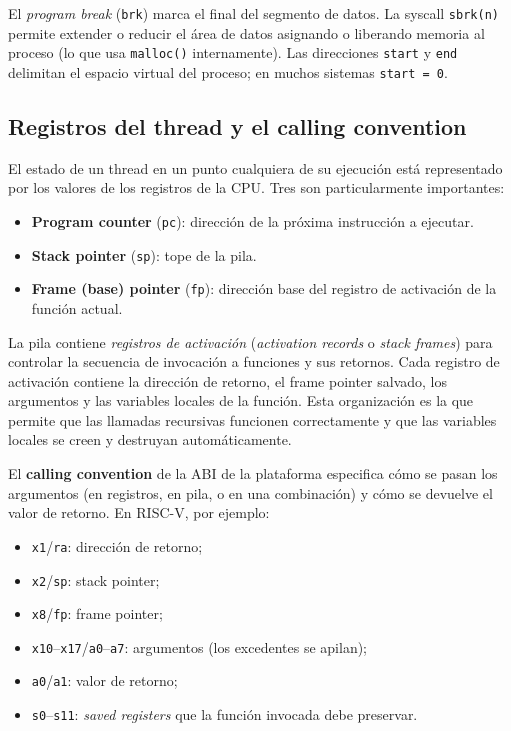 \documentclass[11pt,a4paper]{article}
\begin{document}
El \emph{program break} (\texttt{brk}) marca el final del segmento de
datos. La syscall \texttt{sbrk(n)} permite extender o reducir el área
de datos asignando o liberando memoria al proceso (lo que usa
\texttt{malloc()} internamente). Las direcciones \texttt{start} y
\texttt{end} delimitan el espacio virtual del proceso; en muchos
sistemas \texttt{start = 0}.

\subsection{Registros del thread y el calling convention}

El estado de un thread en un punto cualquiera de su ejecución está
representado por los valores de los registros de la CPU. Tres son
particularmente importantes:

\begin{itemize}[leftmargin=*]
    \item \textbf{Program counter} (\texttt{pc}): dirección de la
        próxima instrucción a ejecutar.
    \item \textbf{Stack pointer} (\texttt{sp}): tope de la pila.
    \item \textbf{Frame (base) pointer} (\texttt{fp}): dirección base
        del registro de activación de la función actual.
\end{itemize}

La pila contiene \emph{registros de activación} (\emph{activation
records} o \emph{stack frames}) para controlar la secuencia de
invocación a funciones y sus retornos. Cada registro de activación
contiene la dirección de retorno, el frame pointer salvado, los
argumentos y las variables locales de la función. Esta organización
es la que permite que las llamadas recursivas funcionen correctamente
y que las variables locales se creen y destruyan automáticamente.

El \textbf{calling convention} de la ABI de la plataforma especifica
cómo se pasan los argumentos (en registros, en pila, o en una
combinación) y cómo se devuelve el valor de retorno. En RISC-V, por
ejemplo:

\begin{itemize}[leftmargin=*,nosep]
    \item \texttt{x1}/\texttt{ra}: dirección de retorno;
    \item \texttt{x2}/\texttt{sp}: stack pointer;
    \item \texttt{x8}/\texttt{fp}: frame pointer;
    \item \texttt{x10}--\texttt{x17}/\texttt{a0}--\texttt{a7}:
        argumentos (los excedentes se apilan);
    \item \texttt{a0}/\texttt{a1}: valor de retorno;
    \item \texttt{s0}--\texttt{s11}: \emph{saved registers} que la
        función invocada debe preservar.
\end{itemize}
\end{document}
